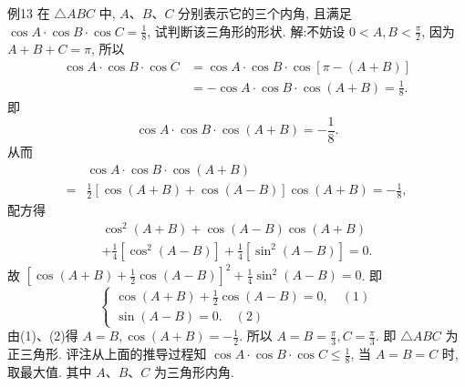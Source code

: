 例13 在 $\triangle A B C$ 中, $A 、 B 、 C$ 分别表示它的三个内角, 且满足 $\cos A \cdot \cos B \cdot \cos C=\frac{1}{8}$, 试判断该三角形的形状.
解:不妨设 $0<A, B<\frac{\pi}{2}$, 因为 $A+B+C=\pi$, 所以
$$
\begin{aligned}
\cos A \cdot \cos B \cdot \cos C & =\cos A \cdot \cos B \cdot \cos [\pi-(A+B)] \\
& =-\cos A \cdot \cos B \cdot \cos (A+B)=\frac{1}{8} .
\end{aligned}
$$
即
$$
\cos A \cdot \cos B \cdot \cos (A+B)=-\frac{1}{8} .
$$
从而
$$
\begin{aligned}
& \cos A \cdot \cos B \cdot \cos (A+B) \\
= & \frac{1}{2}[\cos (A+B)+\cos (A-B)] \cos (A+B)=-\frac{1}{8},
\end{aligned}
$$
配方得
$$
\begin{gathered}
\cos ^2(A+B)+\cos (A-B) \cos (A+B) \\
+\frac{1}{4}\left[\cos ^2(A-B)\right]+\frac{1}{4}\left[\sin ^2(A-B)\right]=0 .
\end{gathered}
$$
故 $\left[\cos (A+B)+\frac{1}{2} \cos (A-B)\right]^2+\frac{1}{4} \sin ^2(A-B)=0$.
即
$$
\left\{\begin{array}{l}
\cos (A+B)+\frac{1}{2} \cos (A-B)=0, \quad (1)\\
\sin (A-B)=0 .\quad (2)
\end{array}\right.
$$
由(1)、(2)得 $A=B, \cos (A+B)=-\frac{1}{2}$. 所以 $A=B=\frac{\pi}{3}, C=\frac{\pi}{3}$. 即 $\triangle A B C$ 为正三角形.
评注从上面的推导过程知 $\cos A \cdot \cos B \cdot \cos C \leqslant \frac{1}{8}$, 当 $A=B=C$ 时, 取最大值.
其中 $A 、 B 、 C$ 为三角形内角.



